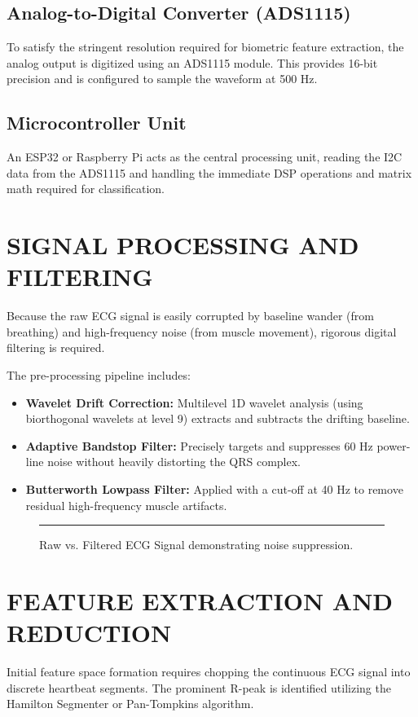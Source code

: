 \documentclass[12pt,a4paper]{report}
\begin{document}
\section{Analog-to-Digital Converter (ADS1115)}
To satisfy the stringent resolution required for biometric feature extraction, the analog output is digitized using an ADS1115 module. This provides 16-bit precision and is configured to sample the waveform at 500 Hz. 

\section{Microcontroller Unit}
An ESP32 or Raspberry Pi acts as the central processing unit, reading the I2C data from the ADS1115 and handling the immediate DSP operations and matrix math required for classification.

\chapter{SIGNAL PROCESSING AND FILTERING}
Because the raw ECG signal is easily corrupted by baseline wander (from breathing) and high-frequency noise (from muscle movement), rigorous digital filtering is required. 

The pre-processing pipeline includes:
\begin{itemize}
    \item \textbf{Wavelet Drift Correction:} Multilevel 1D wavelet analysis (using biorthogonal wavelets at level 9) extracts and subtracts the drifting baseline. 
    \item \textbf{Adaptive Bandstop Filter:} Precisely targets and suppresses 60 Hz power-line noise without heavily distorting the QRS complex.
    \item \textbf{Butterworth Lowpass Filter:} Applied with a cut-off at 40 Hz to remove residual high-frequency muscle artifacts. 
\end{itemize}

\begin{figure}[htbp]
    \centering
    \rule{10cm}{6cm} %
    \caption{Raw vs. Filtered ECG Signal demonstrating noise suppression.}
\end{figure}

\chapter{FEATURE EXTRACTION AND REDUCTION}
Initial feature space formation requires chopping the continuous ECG signal into discrete heartbeat segments. The prominent R-peak is identified utilizing the Hamilton Segmenter or Pan-Tompkins algorithm. 
\end{document}
